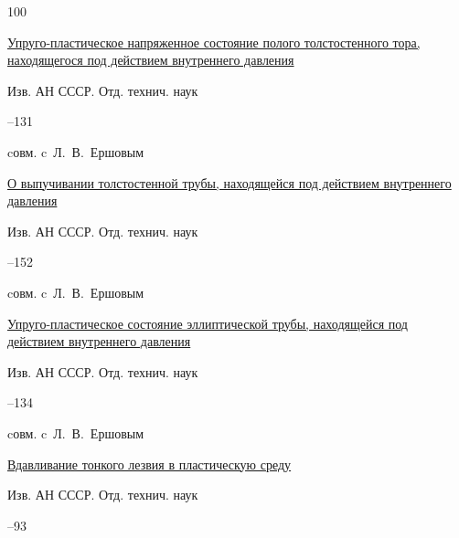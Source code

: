 \begin{thebibliography}{100}

\paper \href{https://zbmath.org/?q=an:0092.42101}{Упруго-пластическое напряженное состояние полого толстостенного тора, находящегося под действием внутреннего давления} 

\jour Изв. АН СССР. Отд. технич. наук



–131 

\miscnote cовм. c~Л.~В.~Ершовым 





\paper \href{https://zbmath.org/?q=an:0096.18602}{О выпучивании толстостенной трубы, находящейся под действием внутреннего давления}

\jour Изв. АН СССР. Отд. технич. наук



–152 

\miscnote cовм. c~Л.~В.~Ершовым 





\paper \href{https://zbmath.org/?q=an:0091.40202}{Упруго-пластическое состояние эллиптической трубы, находящейся под действием внутреннего давления}

\jour Изв. АН СССР. Отд. технич. наук



–134 

\miscnote cовм. c~Л.~В.~Ершовым 





\paper \href{https://zbmath.org/?q=an:0092.42301}{Вдавливание тонкого лезвия в пластическую среду}

\jour Изв. АН СССР. Отд. технич. наук



–93





\end{thebibliography}
